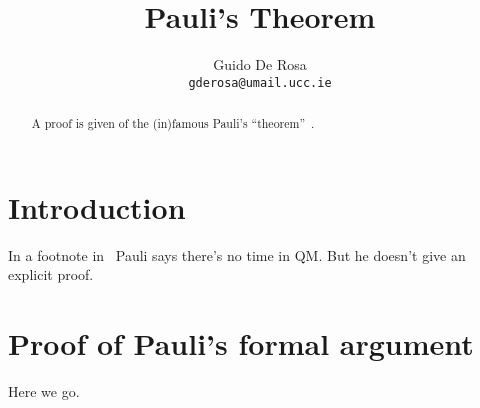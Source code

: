 \documentclass[12pt]{article}
\author{Guido De Rosa \\ \small\tt{gderosa@umail.ucc.ie}}
\title{Pauli's Theorem}
\begin{document}
\maketitle
\begin{abstract}
A proof is given of the (in)famous Pauli's ``theorem''~\cite[footnote 2]{PauliFootnote}.
\end{abstract}
\section{Introduction}
In a footnote in~\cite{PauliFootnote} Pauli says there's no time in QM. But he
doesn't give an explicit proof.

\section{Proof of Pauli's formal argument}\label{proof}
Here we go.



\end{document}
